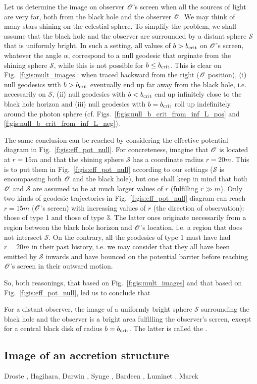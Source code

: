 Let us determine the image on observer $\mathscr{O}$'s screen
when all the sources of light are very far, both
from the black hole and the observer $\mathscr{O}$. We may think of many stars
shining on the celestial sphere. To simplify the problem, we shall assume
that the black hole and the observer are surrounded by a distant
sphere $\mathscr{S}$ that is uniformly bright. In such a setting,
all values of $b > b_{\rm crit}$ on $\mathscr{O}$'s screen, whatever the angle $\alpha$,
correspond to a null geodesic that orginate from the shining sphere $\mathscr{S}$, while
this is not possible for $b \leq b_{\rm crit}$.
This is clear on Fig.~\ref{f:gis:mult_images}: when traced backward from the right
($\mathscr{O}$ position), (i) null geodesics with $b > b_{\rm crit}$ eventually end
up far away from the black hole, i.e. necessarily on $\mathscr{S}$, (ii) null geodesics
with $b < b_{\rm crit}$ end up infinitely close to the black hole horizon
and (iii) null geodesics with $b = b_{\rm crit}$ roll up indefinitely around
the photon sphere (cf. Figs.~\ref{f:gis:null_b_crit_from_inf_L_pos} and
\ref{f:gis:null_b_crit_from_inf_L_neg}).

The same conclusion can be reached
by considering the effective potential diagram in Fig.~\ref{f:gis:eff_pot_null}.
For concreteness, imagine that $\mathscr{O}$ is located at $r=15 m$ and that
the shining sphere $\mathscr{S}$ has a coordinate radius $r=20 m$. This is to put them
in Fig.~\ref{f:gis:eff_pot_null} according
to our settings ($\mathscr{S}$ is encompassing both $\mathscr{O}$ and the black
hole), but one shall keep in mind that both $\mathscr{O}$ and $\mathscr{S}$
are assumed to be at much larger values of $r$ (fulfilling $r\gg m$).
Only two kinds of geodesic
trajectories in Fig.~\ref{f:gis:eff_pot_null} diagram can reach $r = 15m$ ($\mathscr{O}$'s screen) with increasing values
of $r$ (the direction of observation): those of type 1 and those of type 3.
The latter ones originate necessarily from a region between the black hole
horizon and $\mathscr{O}$'s location, i.e. a region that does not intersect $\mathscr{S}$.
On the contrary, all the geodesics of type 1 must have had $r = 20 m$
in their past history, i.e. we may consider that they all have been emitted
by $\mathscr{S}$ inwards and have bounced on the potential barrier before
reaching $\mathscr{O}$'s screen in their outward motion.

So, both reasonings, that based on Fig.~\ref{f:gis:mult_images} and that
based on Fig.~\ref{f:gis:eff_pot_null}, led us to conclude that
\begin{greybox}
For a distant observer, the image of a uniformly bright sphere $\mathscr{S}$ surrounding
the black hole and the observer is a bright area fulfilling
the observer's screen, except for a central black disk of radius $b=b_{\rm crit}$.
The latter is called the
.
\end{greybox}

\subsection{Image of an accretion structure}


\begin{hist}
Droste \cite{Drost1917}, Hagihara,  Darwin \cite{Darwi59}, Synge \cite{Synge66}, Bardeen \cite{Barde73}, Luminet \cite{Lumin79,Lumin19}, Marck \cite{Marck96}
\end{hist}





